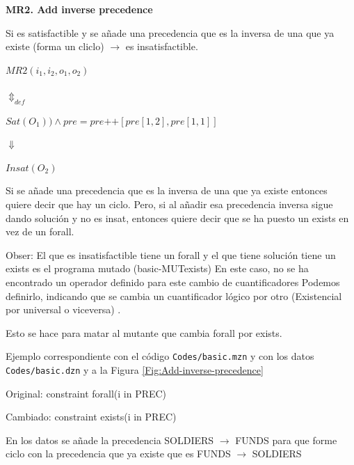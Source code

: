 \begin{framed}
\textbf{MR2. Add inverse precedence}

Si es satisfactible y se añade una precedencia que es la inversa de una que ya existe (forma un cliclo) $\rightarrow$ es insatisfactible.
\end{framed}

\begin{framed}
\begin{center}
$MR2(i_1,i_2,o_1,o_2)$

$ \Updownarrow_{def}$

$Sat (O_1)) \wedge pre = pre \texttt{++} [pre[1,2], pre[1,1]]$  

$\Downarrow$

$Insat(O_2)$
\end{center}
\end{framed}



Si se añade una precedencia que es la inversa de una que ya existe entonces quiere decir que hay un ciclo. Pero, si al añadir esa precedencia inversa sigue dando solución y no es insat, entonces quiere decir que se ha puesto un exists en vez de un forall.

Obser: El que es insatisfactible tiene un forall y el que tiene solución tiene un exists es el programa mutado (basic-MUTexists)
En este caso, no se ha encontrado un operador definido para este cambio de cuantificadores
Podemos definirlo, indicando que se cambia un cuantificador lógico por otro (Existencial por universal o viceversa) .


Esto se hace para matar al mutante que cambia forall por exists.



Ejemplo correspondiente con el código \texttt{Codes/basic.mzn}
y con los datos
\texttt{Codes/basic.dzn} y a la Figura \ref{Fig:Add-inverse-precedence}







Original: constraint forall(i in PREC)

Cambiado: constraint exists(i in PREC)

En los datos se añade la precedencia  SOLDIERS $\rightarrow$ FUNDS para que forme  ciclo con la precedencia que ya existe que es
 FUNDS $\rightarrow$ SOLDIERS
   
   



